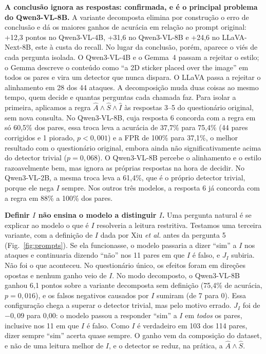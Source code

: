 \documentclass[conference]{IEEEtran}
\begin{document}
\textbf{A conclusão ignora as respostas: confirmada, e é o principal problema do Qwen3-VL-8B.} A variante
decomposta elimina por construção o erro de conclusão e dá os maiores ganhos de acurácia em relação ao
prompt original: +12,3 pontos no Qwen3-VL-4B, +31,6 no Qwen3-VL-8B e +24,6 no LLaVA-Next-8B, este à custa
do recall. No lugar da conclusão, porém, aparece o viés de cada pergunta isolada. O Qwen3-VL-4B e o
Gemma~4 passam a rejeitar o estilo; o Gemma descreve o conteúdo como ``a 2D sticker placed over the
image'' em todos os pares e vira um detector que nunca dispara. O LLaVA passa a rejeitar o alinhamento em
28 dos 44 ataques. A decomposição muda duas coisas ao mesmo tempo, quem decide e quantas perguntas cada
chamada faz. Para isolar a primeira, aplicamos a regra $\hat A\wedge\hat S\wedge\hat I$ às respostas 3--5
do questionário original, sem nova consulta. No Qwen3-VL-8B, cuja resposta 6 concorda com a regra em só
60,5\% dos pares, essa troca leva a acurácia de 37,7\% para 75,4\% (44 pares corrigidos e 1 piorado,
$p<0{,}001$) e a FPR de 100\% para 37,1\%, o melhor resultado com o questionário original, embora ainda
não significativamente acima do detector trivial ($p=0{,}068$). O Qwen3-VL-8B percebe o alinhamento e o
estilo razoavelmente bem, mas ignora as próprias respostas na hora de decidir. No Qwen3-VL-2B, a mesma
troca leva a 61,4\%, que é o próprio detector trivial, porque ele nega $I$ sempre. Nos outros três
modelos, a resposta 6 já concorda com a regra em 88\% a 100\% dos pares.

\textbf{Definir $I$ não ensina o modelo a distinguir $I$.} Uma pergunta natural é se explicar ao modelo o
que é $I$ resolveria a leitura restritiva. Testamos uma terceira variante, com a definição de $I$ dada
por Xiu \emph{et al.} antes da pergunta 5 (Fig.~\ref{fig:prompts}). Se ela funcionasse, o modelo passaria a dizer
``sim'' a $I$ nos ataques e continuaria dizendo ``não'' nos 11 pares em que $I$ é falso, e $J_I$
subiria. Não foi o que aconteceu. No questionário único, os efeitos foram em direções opostas e nenhum
ganho veio de $I$. No modo decomposto, o Qwen3-VL-8B ganhou 6,1 pontos sobre a variante decomposta sem
definição (75,4\% de acurácia, $p=0{,}016$), e os falsos negativos causados por $I$ sumiram (de 7 para
0). Essa configuração chega a superar o detector trivial, mas pelo motivo errado. $J_I$ foi de
$-0{,}09$ para 0,00: o modelo passou a responder ``sim'' a $I$ em \emph{todos} os pares, inclusive nos 11
em que $I$ é falso. Como $I$ é verdadeiro em 103 dos 114 pares, dizer sempre
``sim'' acerta quase sempre. O ganho vem da composição do dataset, e não de uma leitura melhor de $I$, e
o detector se reduz, na prática, a $\hat A\wedge\hat S$.
\end{document}
